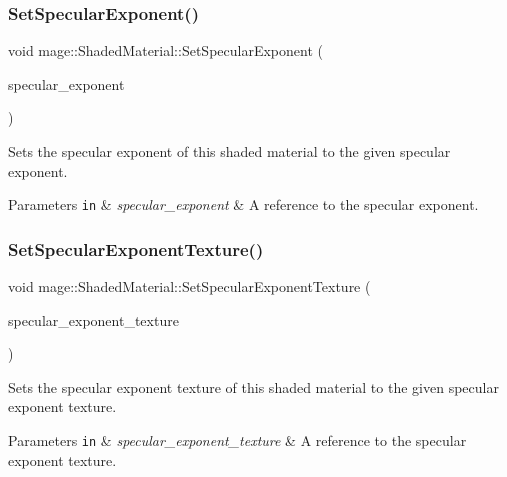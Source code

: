 \subsubsection{\texorpdfstring{Set\+Specular\+Exponent()}{SetSpecularExponent()}}
{\footnotesize\ttfamily void mage\+::\+Shaded\+Material\+::\+Set\+Specular\+Exponent (\begin{DoxyParamCaption}\item[{float}]{specular\+\_\+exponent }\end{DoxyParamCaption})\hspace{0.3cm}{\ttfamily [noexcept]}}

Sets the specular exponent of this shaded material to the given specular exponent.


\begin{DoxyParams}[1]{Parameters}
\mbox{\tt in}  & {\em specular\+\_\+exponent} & A reference to the specular exponent. \\
\hline
\end{DoxyParams}
\hypertarget{structmage_1_1_shaded_material_a5ef7c32a67a49814a448667779cfcb4b}{}\label{structmage_1_1_shaded_material_a5ef7c32a67a49814a448667779cfcb4b} 
\subsubsection{\texorpdfstring{Set\+Specular\+Exponent\+Texture()}{SetSpecularExponentTexture()}}
{\footnotesize\ttfamily void mage\+::\+Shaded\+Material\+::\+Set\+Specular\+Exponent\+Texture (\begin{DoxyParamCaption}\item[{\hyperlink{namespacemage_a1e01ae66713838a7a67d30e44c67703e}{Shared\+Ptr}$<$ \hyperlink{classmage_1_1_texture}{Texture} $>$}]{specular\+\_\+exponent\+\_\+texture }\end{DoxyParamCaption})}

Sets the specular exponent texture of this shaded material to the given specular exponent texture.


\begin{DoxyParams}[1]{Parameters}
\mbox{\tt in}  & {\em specular\+\_\+exponent\+\_\+texture} & A reference to the specular exponent texture. \\
\hline
\end{DoxyParams}
\hypertarget{structmage_1_1_shaded_material_aa31a28ef31f98adf3ccf1fa83e6db9fb}{}\label{structmage_1_1_shaded_material_aa31a28ef31f98adf3ccf1fa83e6db9fb} 
